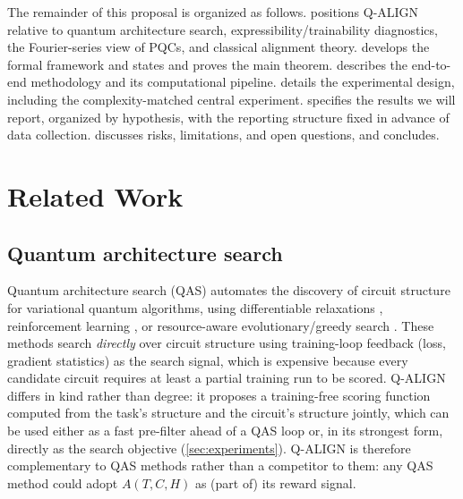 \documentclass[11pt]{article}
\begin{document}
The remainder of this proposal is organized as follows.  positions Q-ALIGN relative to quantum architecture search, expressibility/trainability diagnostics, the Fourier-series view of PQCs, and classical alignment theory.  develops the formal framework and states and proves the main theorem.  describes the end-to-end methodology and its computational pipeline.  details the experimental design, including the complexity-matched central experiment.  specifies the results we will report, organized by hypothesis, with the reporting structure fixed in advance of data collection.  discusses risks, limitations, and open questions, and  concludes.

\section{Related Work}
\label{sec:related}

\subsection{Quantum architecture search}
Quantum architecture search (QAS) automates the discovery of circuit structure for variational quantum algorithms, using differentiable relaxations \citep{zhang2022differentiable}, reinforcement learning \citep{ostaszewski2021reinforcement}, or resource-aware evolutionary/greedy search \citep{du2022quantum}. These methods search \emph{directly} over circuit structure using training-loop feedback (loss, gradient statistics) as the search signal, which is expensive because every candidate circuit requires at least a partial training run to be scored. Q-ALIGN differs in kind rather than degree: it proposes a training-free scoring function computed from the task's structure and the circuit's structure jointly, which can be used either as a fast pre-filter ahead of a QAS loop or, in its strongest form, directly as the search objective (\cref{sec:experiments}). Q-ALIGN is therefore complementary to QAS methods rather than a competitor to them: any QAS method could adopt $A(T,C,H)$ as (part of) its reward signal.
\end{document}
